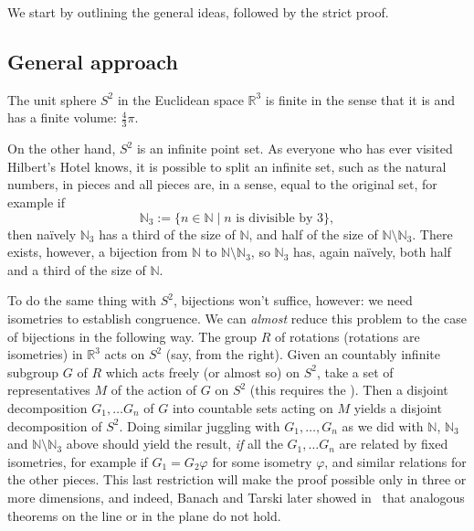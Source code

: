 \documentclass[12pt]{article}
\newcommand{\mbb}{\mathbb}
\begin{document}
We start by outlining the general ideas, followed by the strict proof.

\subsection*{General approach}

The unit sphere $S^2$ in the Euclidean space $\mbb{R}^3$ is
finite in the sense that it is  and has a finite volume:
$\frac{4}{3}\pi$.

On the other hand, $S^2$ is an infinite point set. As everyone who has
ever visited Hilbert's Hotel knows, it is possible to split an
infinite set, such as the natural numbers, in pieces and all pieces
are, in a sense, equal to the original set, for example if
\begin{equation*}
\mbb{N}_3:=\{n\in\mbb{N}\mid n\text{ is divisible by }3\},
\end{equation*}
then na\"{i}vely $\mbb{N}_3$ has a third of the size of $\mbb{N}$, and
half of the size of $\mbb{N}\setminus\mbb{N}_3$. There exists,
however, a bijection from $\mbb{N}$ to $\mbb{N}\setminus\mbb{N}_3$, so
$\mbb{N}_3$ has, again na\"{i}vely, both half and a third of
the size of $\mbb{N}$.

To do the same thing with $S^2$, bijections won't suffice, however: we
need isometries to establish congruence. We can \emph{almost} reduce
this problem to the case of bijections in the following way. The group
$R$ of rotations (rotations are isometries) in $\mbb{R}^3$ acts on
$S^2$ (say, from the right). Given an countably infinite subgroup $G$
of $R$ which acts freely (or almost so) on $S^2$, take a set of 
representatives $M$ of the action of $G$ on $S^2$ (this requires the
). Then a disjoint decomposition
$G_1,\ldots G_n$ of $G$ into
countable sets acting on $M$ yields a disjoint decomposition of
$S^2$. Doing similar juggling with $G_1,\ldots,G_n$ as we did with
$\mbb{N}$, $\mbb{N}_3$ and $\mbb{N}\setminus\mbb{N}_3$ above should
yield the result, \emph{if} all the $G_1,\ldots G_n$ are related by fixed
isometries, for example if $G_1=G_2\varphi$ for some isometry
$\varphi$, and similar relations for the other pieces. This last
restriction will make the proof possible only in three or more
dimensions, and indeed, Banach and Tarski later showed in~\cite{BT}
that analogous theorems on the line or in the plane do not hold.
\end{document}
